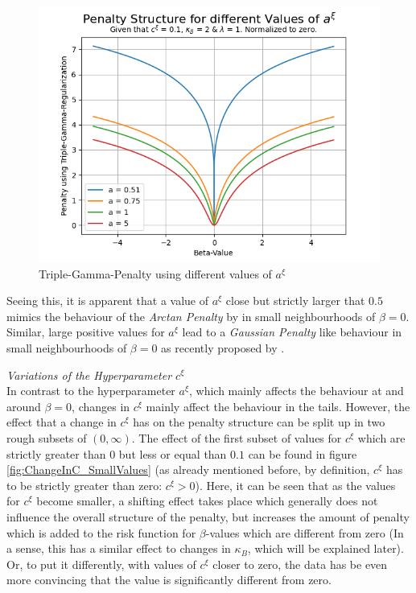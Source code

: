\documentclass[12pt,a4paper]{article}
\begin{document}
\begin{figure}[h!]
\centering
\includegraphics[scale=0.75]{../02_simulation/021_simulation_figures/TGPenalty_ChangeInA.png}
\caption{Triple-Gamma-Penalty using different values of $a^\xi$}
\label{fig:VariationInA}
\end{figure}

Seeing this, it is apparent that a value of $a^\xi$ close but strictly larger that $0.5$ mimics the behaviour of the \textit{Arctan Penalty} by \textcite{WangZhu2016} in small neighbourhoods of $\beta=0$. Similar, large positive values for $a^\xi$ lead to a \textit{Gaussian Penalty} like behaviour in small neighbourhoods of $\beta = 0$ as recently proposed by \textcite{JohnVettamWu2022}.\\
\newpage

\textit{Variations of the Hyperparameter $c^\xi$}\\

In contrast to the hyperparameter $a^\xi$, which mainly affects the behaviour at and around $\beta=0$, changes in $c^\xi$ mainly affect the behaviour in the tails. However, the effect that a change in $c^\xi$ has on the penalty structure can be split up in two rough subsets of $(0,\infty)$. The effect of the first subset of values for $c^\xi$ which are strictly greater than $0$ but less or equal than $0.1$ can be found in figure \ref{fig:ChangeInC_SmallValues} (as already mentioned before, by definition, $c^\xi$ has to be strictly greater than zero: $c^\xi > 0$). Here, it can be seen that as the values for $c^\xi$ become smaller, a shifting effect takes place which generally does not influence the overall structure of the penalty, but increases the amount of penalty which is added to the risk function for $\beta$-values which are different from zero (In a sense, this has a similar effect to changes in $\kappa_B$, which will be explained later). Or, to put it differently, with values of $c^\xi$ closer to zero, the data has be even more convincing that the value is significantly different from zero.\\
\end{document}

